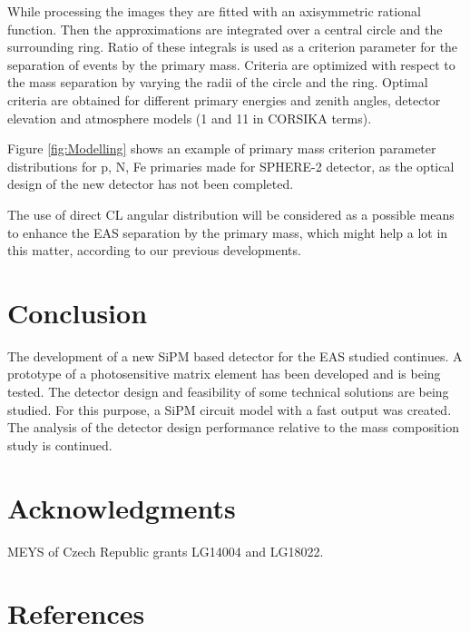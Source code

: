 \documentclass[a4paper]{jpconf}
\begin{document}
While processing the images they are fitted with an axisymmetric rational function. Then the approximations are integrated over a central circle and the surrounding ring. Ratio of these integrals is used as a criterion parameter for the separation of events by the primary mass. Criteria are optimized with respect to the mass separation by varying the radii of the circle and the ring. Optimal criteria are obtained for different primary energies and zenith angles, detector elevation and atmosphere models (1 and 11 in CORSIKA terms).

Figure \ref{fig:Modelling} shows an example of primary mass criterion parameter distributions for p, N, Fe primaries made for SPHERE-2 detector, as the optical design of the new detector has not been completed.

The use of direct CL angular distribution will be considered as a possible means to enhance the EAS separation by the primary mass, which might help a lot in this matter, according to our previous developments\cite{Gal18a}.




\section{Conclusion}
The development of a new SiPM based detector for the EAS studied continues. A prototype of a photosensitive matrix element has been developed and is being tested. The detector design and feasibility of some technical solutions are being studied.  For this purpose, a SiPM circuit model with a fast output was created. The analysis of the detector design performance relative to the mass composition study is continued.

\section{Acknowledgments}
MEYS of Czech Republic grants LG14004 and LG18022.

\section*{References}

\end{document}
